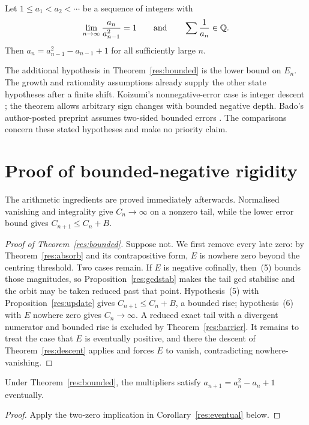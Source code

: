 \documentclass[11pt]{article}
\begin{document}
\begin{problem}[Erd\H{o}s \#243]\label{res:problem}
Let $1\le a_1<a_2<\cdots$ be a sequence of integers with
\[
 \lim_{n\to\infty}\frac{a_n}{a_{n-1}^{2}}=1
 \qquad\text{and}\qquad
 \sum\frac{1}{a_n}\in\mathbb{Q} .
\]
Then $a_n=a_{n-1}^{2}-a_{n-1}+1$ for all sufficiently large $n$.
\end{problem}

The additional hypothesis in Theorem~\ref{res:bounded} is the lower bound
on $E_n$. The growth and rationality assumptions already supply the other
state hypotheses after a finite shift. Koizumi's nonnegative-error case is
integer descent \cite[Proposition~1(2), p.~14]{koizumi2025}; the theorem allows
arbitrary sign changes with bounded negative depth. Bado's author-posted
preprint assumes two-sided bounded errors \cite[Theorem~5.1]{bado2026}.
The comparisons concern these stated hypotheses and make no priority claim.

\section{Proof of bounded-negative rigidity}\label{sec:bounded}
The arithmetic ingredients are proved immediately afterwards. Normalised
vanishing and integrality give $C_n\to\infty$ on a nonzero tail, while the
lower error bound gives $C_{n+1}\le C_n+B$.

\begin{proof}[Proof of Theorem~\ref{res:bounded}]
Suppose not.  We first remove every late zero: by Theorem~\ref{res:absorb} and
its contrapositive form, $E$ is nowhere zero beyond the centring threshold.
Two cases remain.  If $E$ is negative cofinally,
then~(5) bounds those magnitudes, so Proposition~\ref{res:gcdstab} makes the
tail gcd stabilise and the orbit may be taken reduced past that point.
Hypothesis~(5) with
Proposition~\ref{res:update} gives $C_{n+1}\le C_n+B$, a bounded rise;
hypothesis~(6) with $E$ nowhere zero gives $C_n\to\infty$.  A reduced exact
tail with a divergent numerator and bounded rise is excluded by
Theorem~\ref{res:barrier}.  It remains to treat the case that $E$ is eventually
positive, and there the descent
of Theorem~\ref{res:descent} applies and forces $E$ to vanish, contradicting
nowhere-vanishing.
\end{proof}

\begin{corollary}\label{res:cor}
Under Theorem~\ref{res:bounded}, the multipliers satisfy
$a_{n+1}=a_n^2-a_n+1$ eventually.
\end{corollary}
\begin{proof}
Apply the two-zero implication in Corollary~\ref{res:eventual} below.
\end{proof}
\end{document}
